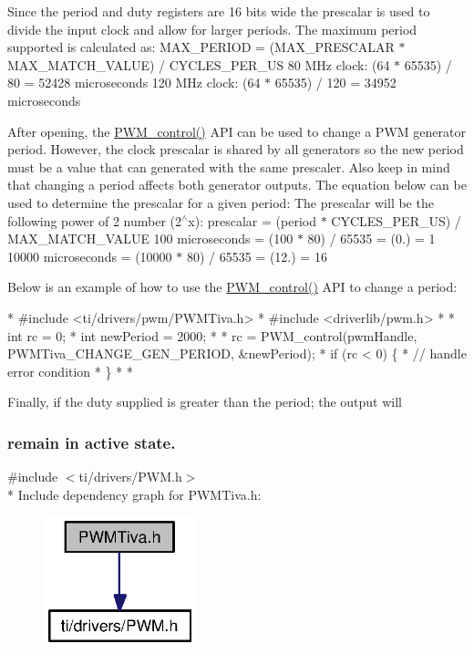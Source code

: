 Since the period and duty registers are 16 bits wide the prescalar is used to divide the input clock and allow for larger periods. The maximum period supported is calculated as\-: M\-A\-X\-\_\-\-P\-E\-R\-I\-O\-D = (M\-A\-X\-\_\-\-P\-R\-E\-S\-C\-A\-L\-A\-R $\ast$ M\-A\-X\-\_\-\-M\-A\-T\-C\-H\-\_\-\-V\-A\-L\-U\-E) / C\-Y\-C\-L\-E\-S\-\_\-\-P\-E\-R\-\_\-\-U\-S 80 M\-Hz clock\-: (64 $\ast$ 65535) / 80 = 52428 microseconds 120 M\-Hz clock\-: (64 $\ast$ 65535) / 120 = 34952 microseconds

After opening, the \hyperlink{_p_w_m_8h_ade999f5b12997479efa1ac85aaf46ef5}{P\-W\-M\-\_\-control()} A\-P\-I can be used to change a P\-W\-M generator period. However, the clock prescalar is shared by all generators so the new period must be a value that can generated with the same prescaler. Also keep in mind that changing a period affects both generator outputs. The equation below can be used to determine the prescalar for a given period\-: The prescalar will be the following power of 2 number (2$^\wedge$x)\-: prescalar = (period $\ast$ C\-Y\-C\-L\-E\-S\-\_\-\-P\-E\-R\-\_\-\-U\-S) / M\-A\-X\-\_\-\-M\-A\-T\-C\-H\-\_\-\-V\-A\-L\-U\-E 100 microseconds = (100 $\ast$ 80) / 65535 = (0.) = 1 10000 microseconds = (10000 $\ast$ 80) / 65535 = (12.) = 16

Below is an example of how to use the \hyperlink{_p_w_m_8h_ade999f5b12997479efa1ac85aaf46ef5}{P\-W\-M\-\_\-control()} A\-P\-I to change a period\-:


\begin{DoxyCode}
* #include <ti/drivers/pwm/PWMTiva.h>
* #include <driverlib/pwm.h>
*
* \textcolor{keywordtype}{int} rc = 0;
* \textcolor{keywordtype}{int} newPeriod = 2000;
*
* rc = PWM_control(pwmHandle, PWMTiva_CHANGE_GEN_PERIOD, &newPeriod);
* \textcolor{keywordflow}{if} (rc < 0) \{
*     \textcolor{comment}{// handle error condition}
* \}
*
* 
\end{DoxyCode}


Finally, if the duty supplied is greater than the period; the output will \subsubsection*{remain in active state. }{\ttfamily \#include $<$ti/drivers/\-P\-W\-M.\-h$>$}\\*
Include dependency graph for P\-W\-M\-Tiva.\-h\-:
\nopagebreak
\begin{figure}[H]
\begin{center}
\leavevmode
\includegraphics[width=125pt]{_p_w_m_tiva_8h__incl}
\end{center}
\end{figure}
